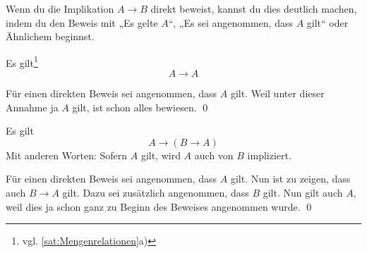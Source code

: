   
  
  \begin{bem}[Signalwörter]
Wenn du die Implikation $A\to B$ direkt beweist, kannst du dies deutlich machen, indem du den Beweis mit „Es gelte $A$“, „Es sei angenommen, dass $A$ gilt“ oder Ähnlichem beginnst.%
\end{bem}

  

  \begin{sat} \label{AtoA}
Es gilt\footnote{vgl. \cref{sat:Mengenrelationen}a)}
   \[ A\to A \]
  \end{sat}
  \begin{bew}
   Für einen direkten Beweis sei angenommen, dass $A$ gilt. Weil unter dieser Annahme ja $A$ gilt, ist schon alles bewiesen. \qed
  \end{bew}

  
  
  \begin{sat}
   Es gilt
   \[ A \to (B\to A)   \]
Mit anderen Worten: Sofern $A$ gilt, wird $A$ auch von $B$ impliziert.
  \end{sat}
\begin{bew}
 Für einen direkten Beweis sei angenommen, dass $A$ gilt. Nun ist zu zeigen, dass auch $B\to A$ gilt. Dazu sei zusätzlich angenommen, dass $B$ gilt. Nun gilt auch $A$, weil dies ja schon ganz zu Beginn des Beweises angenommen wurde. \qed
\end{bew}



